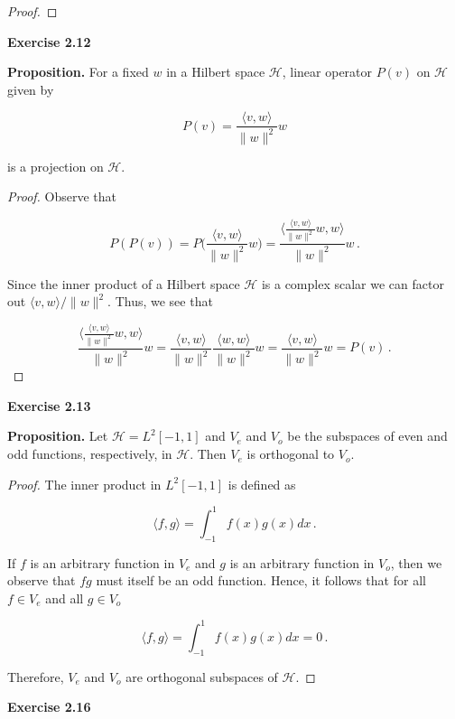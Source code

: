 \documentclass[a4paper]{article}
\numberwithin{equation}{section}
\begin{document}
\begin{description}
\begin{proof}
\end{proof}

\item \textbf{Exercise 2.12}

\item \textbf{Proposition.} For a fixed $w$ in a Hilbert space $\mathcal{H}$, linear operator $P(v)$ on $\mathcal{H}$ given by 

$$P(v) = \frac{\langle v,w \rangle}{\|w\|^2}w$$

is a projection on $\mathcal{H}$.

\begin{proof} Observe that 

$$P(P(v)) = P\Big(\frac{\langle v,w \rangle}{\|w\|^2}w\Big) = \frac{\langle \frac{\langle v,w \rangle}{\|w\|^2}w,w \rangle}{\|w\|^2}w\,.$$

Since the inner product of a Hilbert space $\mathcal{H}$ is a complex scalar we can factor out $\langle v,w \rangle/ \|w\|^2$. Thus, we see that

$$\frac{\langle \frac{\langle v,w \rangle}{\|w\|^2}w,w \rangle}{\|w\|^2}w = \frac{\langle v,w \rangle}{\|w\|^2}\frac{\langle w,w \rangle}{\|w\|^2}w = \frac{\langle v,w \rangle}{\|w\|^2}w = P(v)\,.$$

\end{proof}

\item \textbf{Exercise 2.13}

\item \textbf{Proposition.} Let $\mathcal{H} = L^2[-1,1]$ and $V_e$ and $V_o$ be the subspaces of even and odd functions, respectively, in $\mathcal{H}$. Then $V_e$ is orthogonal to $V_o$.

\begin{proof} The inner product in $L^2[-1,1]$ is defined as

$$\langle f,g \rangle = \int_{-1}^1 f(x)g(x)dx\,.$$

If $f$ is an arbitrary function in $V_e$ and $g$ is an arbitrary function in $V_o$, then we observe that $fg$ must itself be an odd function. Hence, it follows that for all $f \in V_e$ and all $g \in V_o$

$$\langle f,g \rangle = \int_{-1}^1 f(x)g(x)dx = 0\,.$$
 
Therefore, $V_e$ and $V_o$ are orthogonal subspaces of $\mathcal{H}$.

\end{proof}

\item \textbf{Exercise 2.16}


\end{description}
\end{document}
